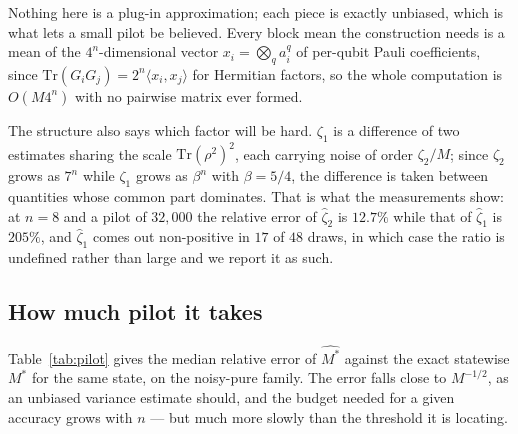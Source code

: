 Nothing here is a plug-in approximation; each piece is exactly unbiased, which is what lets a
small pilot be believed. Every block mean the construction needs is a mean of the
\(4^n\)-dimensional vector \(x_i = \bigotimes_q a_i^q\) of per-qubit Pauli coefficients, since
\(\mathrm{Tr}(G_iG_j) = 2^n \langle x_i, x_j\rangle\) for Hermitian factors, so the whole
computation is \(O(M 4^n)\) with no pairwise matrix ever formed.

The structure also says which factor will be hard. \(\zeta_1\) is a difference of two estimates
sharing the scale \(\mathrm{Tr}(\rho^2)^2\), each carrying noise of order \(\zeta_2/M\); since
\(\zeta_2\) grows as \(7^n\) while \(\zeta_1\) grows as \(\beta^n\) with \(\beta = 5/4\), the
difference is taken between quantities whose common part dominates. That is what the measurements
show: at \(n = 8\) and a pilot of \(32{,}000\) the relative error of \(\hat\zeta_2\) is
\(12.7\%\) while that of \(\hat\zeta_1\) is \(205\%\), and \(\hat\zeta_1\) comes out non-positive
in \(17\) of \(48\) draws, in which case the ratio is undefined rather than large and we report it
as such.

\hypertarget{how-much-pilot-it-takes}{%
\subsection{How much pilot it takes}\label{how-much-pilot-it-takes}}

Table~\ref{tab:pilot} gives the median relative error of \(\widehat{M^*}\) against the exact
statewise \(M^*\) for the same state, on the noisy-pure family. The error falls close to
\(M^{-1/2}\), as an unbiased variance estimate should, and the budget needed for a given accuracy
grows with \(n\) --- but much more slowly than the threshold it is locating.

